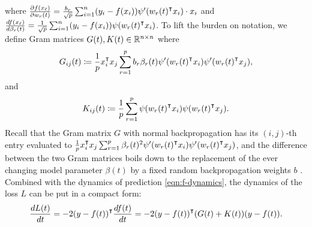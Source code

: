 where $\frac{\partial f(x_\ell)}{\partial w_r(t)} = \frac{b_r}{\sqrt{p}}\sum_{i=1}^n (y_i - f(x_i)) \psi'(w_r(t)\transpose x_i)\cdot x_i$ and $\frac{\diff f(x_\ell)}{\diff \beta_r(t)} = \frac{1}{\sqrt{p}}\sum_{i=1}^n (y_i - f(x_i))\psi(w_r(t)\transpose x_i)$. 
To lift the burden on notation, we define Gram matrices $G(t), K(t)\in{\mathbb{R}^{n\times n}}$ where 
\begin{align}\label{eqn:gram1-def}
    G_{ij}(t) \defeq \frac{1}{p} x_i\transpose x_j \sum_{r=1}^p b_r\beta_r(t)\psi'(w_r(t)\transpose x_i) \psi'(w_r(t)\transpose x_j),
\end{align}
and 
\begin{align}\label{eqn:gram2-def}
    K_{ij}(t) \defeq \frac{1}{p} \sum_{r=1}^p \psi(w_r(t)\transpose x_i)\psi(w_r(t)\transpose x_j).
\end{align}
Recall that the Gram matrix $G$ with normal backpropagation has its $(i,j)$-th entry evaluated to $\frac{1}{p} x_i\transpose x_j \sum_{r=1}^p \beta_r(t)^2\psi'(w_r(t)\transpose x_i) \psi'(w_r(t)\transpose x_j)$, and the difference between the two Gram matrices boils down to the replacement of the ever changing model parameter $\beta(t)$ by a fixed random backpropagation weights $b$ \citep{du2018gradient}.
Combined with the dynamics of prediction \eqref{eqn:f-dynamics}, the dynamics of the loss $L$ can be put in a compact form:
\begin{align}\label{eqn:ode}
    \frac{\diff L(t)}{\diff t} = -2 (y - f(t))\transpose \frac{\diff f(t)}{\diff t} = -2 (y - f(t))\transpose(G(t) + K(t))(y - f(t)).
\end{align}

